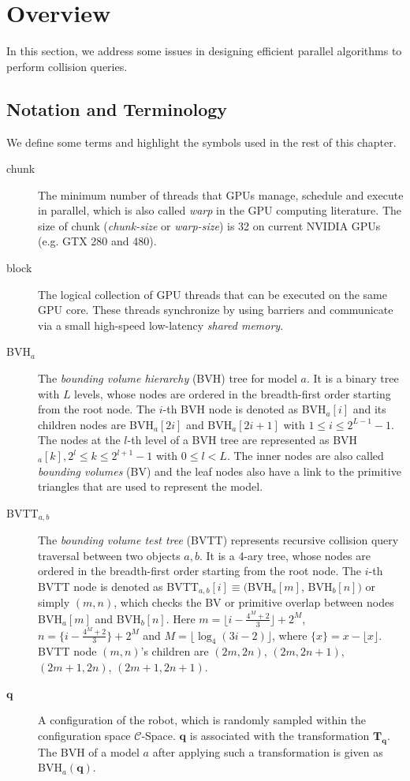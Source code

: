 \section{Overview}
\label{sec:5:overview}
In this section, we address
some issues in designing efficient parallel algorithms to perform collision queries.

\subsection{Notation and Terminology}
We define some terms and highlight the symbols used in the rest of this chapter.
\begin{description}
\item[chunk] The minimum number of threads that GPUs manage, schedule and execute in parallel, which is also called \emph{warp} in the GPU computing literature. The size of chunk (\emph{chunk-size} or \emph{warp-size}) is 32 on current NVIDIA GPUs (e.g. GTX 280 and 480).
\item[block] The logical collection of GPU threads that can be executed on the same GPU core. These threads synchronize by using barriers
and communicate via a small high-speed low-latency \emph{shared memory}.
\item[BVH$_a$] The \emph{bounding volume hierarchy} (BVH) tree for model $a$. It is a binary tree with $L$ levels, whose nodes are ordered in the breadth-first order starting from the root node. The $i$-th BVH node is denoted as BVH$_a[i]$ and its children nodes are
BVH$_a[2i]$ and BVH$_a[2i+1]$ with $1\leq i \leq 2^{L-1}-1$. The nodes at the $l$-th level of a BVH tree are represented as
BVH$_a[k], 2^l \leq k \leq 2^{l+1} - 1$ with $0
\leq l < L$. The inner nodes are also called \emph{bounding volumes} (BV) and the leaf nodes also have a link to the primitive
triangles that are used to represent the model.
\item[BVTT$_{a,b}$] The \emph{bounding volume test tree} (BVTT) represents recursive collision query traversal between two
objects $a, b$. It is a 4-ary tree, whose nodes are ordered in the breadth-first order starting from the root node. The $i$-th BVTT node is denoted as BVTT$_
{a,b}[i]\equiv ($BVH$_a[m]$, BVH$_b[n])$ or simply $(m, n)$, which checks the BV or primitive overlap between nodes BVH$_a[m]$ and BVH$_b[n]$. Here $m = \lfloor i - \frac{4^M + 2}{3} \rfloor + 2^M$, $n = \{i - \frac{4^M + 2}{3}\} + 2^M$ and $M = \lfloor \log_4(3i -
2) \rfloor$, where $\{x\} = x - \lfloor x \rfloor$. BVTT node $(m, n)$'s children are $(2m, 2n)$, $(2m, 2n+1)$, $(2m+1,2n)$, $(2m+1,2n+1)$.
\item[$\mathbf{q}$] A configuration of the robot, which is randomly sampled within the
configuration space $\mathcal{C}$-Space.  $\mathbf{q}$ is associated with the transformation $\mathbf{T}_{\mathbf{q}}$.
The BVH of a model $a$ after applying such a transformation is given as BVH$_a(\mathbf{q})$.
\end{description}

